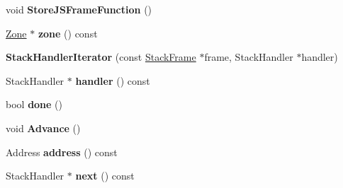 \begin{DoxyCompactItemize}
\item 
void {\bfseries Store\+J\+S\+Frame\+Function} ()\hypertarget{classv8_1_1internal_1_1_b_a_s_e___e_m_b_e_d_d_e_d_a1e70fc67bd0cdf098413dcda9b976b9e}{}\label{classv8_1_1internal_1_1_b_a_s_e___e_m_b_e_d_d_e_d_a1e70fc67bd0cdf098413dcda9b976b9e}

\item 
\hyperlink{classv8_1_1internal_1_1_zone}{Zone} $\ast$ {\bfseries zone} () const \hypertarget{classv8_1_1internal_1_1_b_a_s_e___e_m_b_e_d_d_e_d_a52fc0e306aa3628bf7e2d0c397a1f5c6}{}\label{classv8_1_1internal_1_1_b_a_s_e___e_m_b_e_d_d_e_d_a52fc0e306aa3628bf7e2d0c397a1f5c6}

\item 
{\bfseries Stack\+Handler\+Iterator} (const \hyperlink{classv8_1_1_stack_frame}{Stack\+Frame} $\ast$frame, Stack\+Handler $\ast$handler)\hypertarget{classv8_1_1internal_1_1_b_a_s_e___e_m_b_e_d_d_e_d_ab3e87f05abd12163642b2a13fe548564}{}\label{classv8_1_1internal_1_1_b_a_s_e___e_m_b_e_d_d_e_d_ab3e87f05abd12163642b2a13fe548564}

\item 
Stack\+Handler $\ast$ {\bfseries handler} () const \hypertarget{classv8_1_1internal_1_1_b_a_s_e___e_m_b_e_d_d_e_d_a17b24738b33e4e7b769cf45b217f4873}{}\label{classv8_1_1internal_1_1_b_a_s_e___e_m_b_e_d_d_e_d_a17b24738b33e4e7b769cf45b217f4873}

\item 
bool {\bfseries done} ()\hypertarget{classv8_1_1internal_1_1_b_a_s_e___e_m_b_e_d_d_e_d_a118ffb93fd223f5af92be43ac015571e}{}\label{classv8_1_1internal_1_1_b_a_s_e___e_m_b_e_d_d_e_d_a118ffb93fd223f5af92be43ac015571e}

\item 
void {\bfseries Advance} ()\hypertarget{classv8_1_1internal_1_1_b_a_s_e___e_m_b_e_d_d_e_d_a3d99e222f406f37deb9382e9e370b68a}{}\label{classv8_1_1internal_1_1_b_a_s_e___e_m_b_e_d_d_e_d_a3d99e222f406f37deb9382e9e370b68a}

\item 
Address {\bfseries address} () const \hypertarget{classv8_1_1internal_1_1_b_a_s_e___e_m_b_e_d_d_e_d_a51a0ede6e14d53b7ac296a0ee52b48c0}{}\label{classv8_1_1internal_1_1_b_a_s_e___e_m_b_e_d_d_e_d_a51a0ede6e14d53b7ac296a0ee52b48c0}

\item 
Stack\+Handler $\ast$ {\bfseries next} () const \hypertarget{classv8_1_1internal_1_1_b_a_s_e___e_m_b_e_d_d_e_d_a676ea35898a97184f6da4bc40f78d488}{}\label{classv8_1_1internal_1_1_b_a_s_e___e_m_b_e_d_d_e_d_a676ea35898a97184f6da4bc40f78d488}


\end{DoxyCompactItemize}
